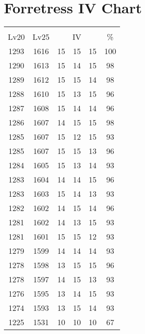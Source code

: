\documentclass{article}%
\begin{document}
%
\normalsize%
\section{Forretress IV Chart}%
\label{sec:Forretress IV Chart}%
\renewcommand{\arraystretch}{1.5}%
\begin{tabular}{|c|c|c|c|c|c|}%
\hline%
\multicolumn{6}{|c|}{\textcolor{white}{ 
\linebreak{Forretress}
}%
\cellcolor{black}}\\%
\multicolumn{1}{|c}{Lv20}&\multicolumn{1}{c|}{Lv25}&\multicolumn{3}{c|}{IV}&\multicolumn{1}{|c|}{\%}\\%
\hline%
\rowcolor{color100}%
1293&1616&15&15&15&100\\%
\hline%
\rowcolor{color98}%
1290&1613&15&14&15&98\\%
\hline%
\rowcolor{color98}%
1289&1612&15&15&14&98\\%
\hline%
\rowcolor{color96}%
1288&1610&15&13&15&96\\%
\hline%
\rowcolor{color96}%
1287&1608&15&14&14&96\\%
\hline%
\rowcolor{color98}%
1286&1607&14&15&15&98\\%
\hline%
\rowcolor{color93}%
1285&1607&15&12&15&93\\%
\hline%
\rowcolor{color96}%
1285&1607&15&15&13&96\\%
\hline%
\rowcolor{color93}%
1284&1605&15&13&14&93\\%
\hline%
\rowcolor{color96}%
1283&1604&14&14&15&96\\%
\hline%
\rowcolor{color93}%
1283&1603&15&14&13&93\\%
\hline%
\rowcolor{color96}%
1282&1602&14&15&14&96\\%
\hline%
\rowcolor{color93}%
1281&1602&14&13&15&93\\%
\hline%
\rowcolor{color93}%
1281&1601&15&15&12&93\\%
\hline%
\rowcolor{color93}%
1279&1599&14&14&14&93\\%
\hline%
\rowcolor{color96}%
1278&1598&13&15&15&96\\%
\hline%
\rowcolor{color93}%
1278&1597&14&15&13&93\\%
\hline%
\rowcolor{color93}%
1276&1595&13&14&15&93\\%
\hline%
\rowcolor{color93}%
1274&1593&13&15&14&93\\%
\hline%
\rowcolor{color91}%
1225&1531&10&10&10&67\\%
\end{tabular}

%
\end{document}
